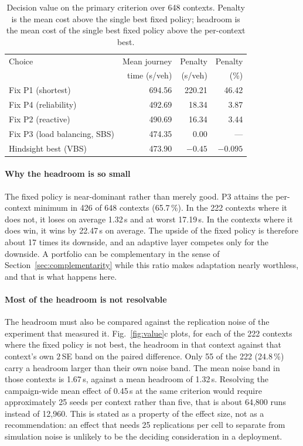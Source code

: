 \documentclass[preprint,12pt]{elsarticle}
\begin{document}
\begin{table}[htbp]
\centering\small
\caption{Decision value on the primary criterion over 648 contexts. Penalty is
the mean cost above the single best fixed policy; headroom is the mean cost of
the single best fixed policy above the per-context best.}
\label{tab:value}
\begin{tabular}{@{}lrrr@{}}
\toprule
Choice & Mean journey & Penalty & Penalty\\
 & time (s/veh) & (s/veh) & (\%)\\
\midrule
Fix P1 (shortest) & 694.56 & 220.21 & 46.42\\
Fix P4 (reliability) & 492.69 & 18.34 & 3.87\\
Fix P2 (reactive) & 490.69 & 16.34 & 3.44\\
Fix P3 (load balancing, SBS) & 474.35 & 0.00 & ---\\
\midrule
Hindsight best (VBS) & 473.90 & $-0.45$ & $-0.095$\\
\bottomrule
\end{tabular}
\end{table}

\paragraph{Why the headroom is so small}
The fixed policy is near-dominant rather than merely good. P3 attains the
per-context minimum in 426 of 648 contexts (65.7\,\%). In the 222 contexts where
it does not, it loses on average 1.32\,s and at worst 17.19\,s. In the contexts
where it does win, it wins by 22.47\,s on average. The upside of the fixed policy
is therefore about 17 times its downside, and an adaptive layer competes only
for the downside. A portfolio can be complementary in the sense of
Section~\ref{sec:complementarity} while this ratio makes adaptation nearly
worthless, and that is what happens here.

\paragraph{Most of the headroom is not resolvable}
The headroom must also be compared against the replication noise of the
experiment that measured it. Fig.~\ref{fig:value}c plots, for each of the 222
contexts where the fixed policy is not best, the headroom in that context against
that context's own $2\,$SE band on the paired difference. Only 55 of the 222
(24.8\,\%) carry a headroom larger than their own noise band. The mean noise band
in those contexts is 1.67\,s, against a mean headroom of 1.32\,s. Resolving the
campaign-wide mean effect of 0.45\,s at the same criterion would require
approximately 25 seeds per context rather than five, that is about 64{,}800 runs
instead of 12{,}960. This is stated as a property of the effect size, not as a
recommendation: an effect that needs 25 replications per cell to separate from
simulation noise is unlikely to be the deciding consideration in a deployment.
\end{document}
